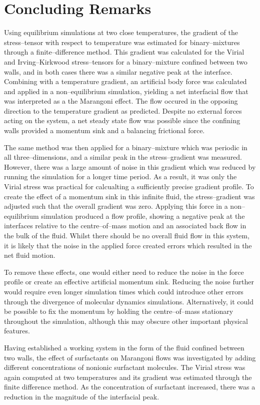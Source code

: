 \section{Concluding Remarks}
Using equilibrium simulations at two close temperatures, the gradient of the stress--tensor with respect to temperature was estimated for binary--mixtures through a finite--difference method.
This gradient was calculated for the Virial and Irving--Kirkwood stress--tensors for a binary--mixture confined between two walls, and in both cases there was a similar negative peak at the interface.
Combining with a temperature gradient, an artificial body force was calculated and applied in a non--equilibrium simulation, yielding a net interfacial flow that was interpreted as a the Marangoni effect.
The flow occured in the opposing direction to the temperature gradient as predicted.
Despite no external forces acting on the system, a net steady state flow was possible since the confining walls provided a momentum sink and a balancing frictional force.

The same method was then applied for a binary--mixture which was periodic in all three--dimensions, and a similar peak in the stress--gradient was measured.
However, there was a large amount of noise in this gradient which was reduced by running the simulation for a longer time period.
As a result, it was only the Virial stress was practical for calcualting a sufficiently precise gradient profile.
To create the effect of a momentum sink in this infinite fluid, the stress--gradient was adjusted such that the overall gradient was zero.
Applying this force in a non--equilibrium simulation produced a flow profile, showing a negative peak at the interfaces relative to the centre--of--mass motion and an associated back flow in the bulk of the fluid.
Whilst there should be no overall fluid flow in this system, it is likely that the noise in the applied force created errors which resulted in the net fluid motion. 

To remove these effects, one would either need to reduce the noise in the force profile or create an effective artificial momentum sink.
Reducing the noise further would require even longer simulation times which could introduce other errors through the divergence of molecular dynamics simulations.
Alternatively, it could be possible to fix the momentum by holding the centre--of--mass stationary throughout the simulation, although this may obscure other important physical features.

Having established a working system in the form of the fluid confined between two walls, the effect of surfactants on Marangoni flows was investigated by adding different concentrations of nonionic surfactant molecules.
The Virial stress was again computed at two temperatures and its gradient was estimated through the finite difference method.
As the concentration of surfactant increased, there was a reduction in the magnitude of the interfacial peak.

